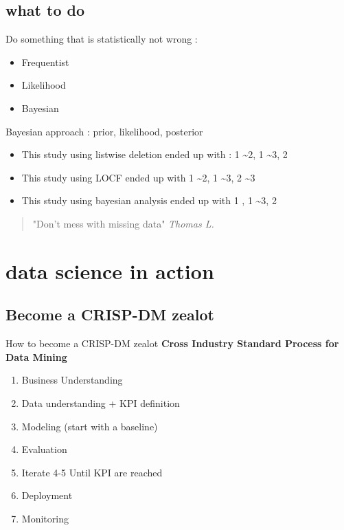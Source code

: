 \documentclass{beamer}
\begin{document}
\subsection{what to do}
\begin{frame}
	\Large Do something that is statistically not wrong :
	\begin{itemize}
		\item Frequentist
		\item Likelihood 
		\item Bayesian 
        \end{itemize}
        Bayesian approach : prior, likelihood, posterior
\end{frame}

\begin{frame}
	\begin{itemize}
		\item This study using listwise deletion ended up with : 1 \sim 2, 1 \sim 3, 2 
		\item This study using LOCF ended up with 1 \sim 2, 1 \sim 3, 2 \sim 3
        	\item This study using bayesian analysis ended up with 1 , 1 \sim 3, 2 
	\end{itemize}
        \begin{quote}
		"Don't mess with missing data" \textit{Thomas L.}
	\end{quote}
\end{frame}

\section{data science in action}

\subsection{Become a CRISP-DM zealot}
\begin{frame}
        \Large{How to become a CRISP-DM zealot}
	\textbf{Cross Industry Standard Process for Data Mining}
	\begin{enumerate}
		\item<1- | alert@1> Business Understanding 
		\item<2- | alert@2> Data understanding + KPI definition 
		\item<3- | alert@3> Modeling (start with a baseline) 
		\item<4- | alert@4> Evaluation  
		\item<5- | alert@5> Iterate 4-5 Until KPI are reached 
		\item<6- | alert@6> Deployment  
		\item<8- | alert@7> Monitoring 
	\end{enumerate}
\end{frame}
\end{document}
